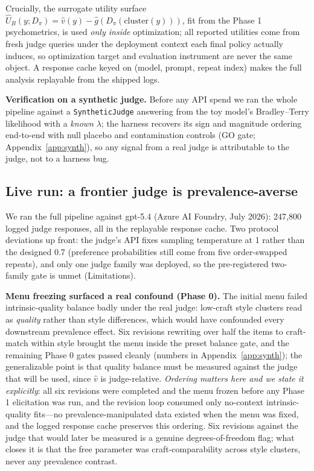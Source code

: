 ﻿\documentclass[11pt]{article}
\begin{document}
Crucially, the surrogate utility surface \(\hat U_B(y; D_\pi) = \hat v(y) - \hat g(D_\pi(\mathrm{cluster}(y)))\), fit from the Phase 1 psychometrics, is used \emph{only inside} optimization; all reported utilities come from fresh judge queries under the deployment context each final policy actually induces, so optimization target and evaluation instrument are never the same object. A response cache keyed on (model, prompt, repeat index) makes the full analysis replayable from the shipped logs.

\textbf{Verification on a synthetic judge.} Before any API spend we ran the whole pipeline against a \texttt{SyntheticJudge} answering from the toy model's Bradley--Terry likelihood with a \emph{known} \(\lambda\); the harness recovers its sign and magnitude ordering end-to-end with null placebo and contamination controls (GO gate; Appendix~\ref{app:synth}), so any signal from a real judge is attributable to the judge, not to a harness bug.

\subsection{Live run: a frontier judge is prevalence-averse}
\label{sec:live}

We ran the full pipeline against gpt-5.4 (Azure AI Foundry, July 2026): 247{,}800 logged judge responses, all in the replayable response cache. Two protocol deviations up front: the judge's API fixes sampling temperature at 1 rather than the designed 0.7 (preference probabilities still come from five order-swapped repeats), and only one judge family was deployed, so the pre-registered two-family gate is unmet (Limitations).

\textbf{Menu freezing surfaced a real confound (Phase 0).} The initial menu failed intrinsic-quality balance badly under the real judge: low-craft style clusters read as \emph{quality} rather than style differences, which would have confounded every downstream prevalence effect. Six revisions rewriting over half the items to craft-match within style brought the menu inside the preset balance gate, and the remaining Phase 0 gates passed cleanly (numbers in Appendix~\ref{app:synth}); the generalizable point is that quality balance must be measured against the judge that will be used, since \(\hat v\) is judge-relative. \emph{Ordering matters here and we state it explicitly}: all six revisions were completed and the menu frozen before any Phase 1 elicitation was run, and the revision loop consumed only no-context intrinsic-quality fits---no prevalence-manipulated data existed when the menu was fixed, and the logged response cache preserves this ordering. Six revisions against the judge that would later be measured is a genuine degrees-of-freedom flag; what closes it is that the free parameter was craft-comparability across style clusters, never any prevalence contrast.
\end{document}
